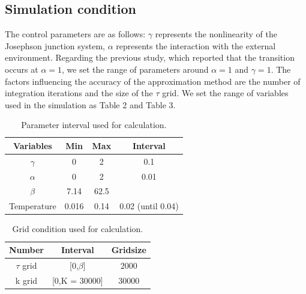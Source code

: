 \documentclass{article}[12pt]
\begin{document}
\begin{spacing}{1.5}
\subsection{Simulation condition}
The control parameters are as follows: $\gamma$ represents the nonlinearity of the Josephson junction system, 
$\alpha$ represents the interaction with the external environment. Regarding the previous study, which reported 
that the transition occurs at $\alpha = 1$, we set the range of parameters around $\alpha = 1$ and $\gamma = 1$. 
The factors influencing the accuracy of the approximation method are the number of integration iterations and the size of the $\tau$ grid. 
We set the range of variables used in the simulation as Table 2 and Table 3.
\begin{table}[htbp]
  \centering
  \renewcommand{\arraystretch}{1.2}  %
  \begin{tabular}{@{}cccc@{}}
  \toprule
  \textbf{Variables} & \textbf{Min} & \textbf{Max}  & \textbf{Interval}\\ 
  \midrule
  $\gamma$ & 0 & 2 & 0.1 \\
  $\alpha$ & 0 & 2 & 0.01 \\
  $\beta$ & 7.14 & 62.5 &  \\
  Temperature & 0.016 & 0.14 & 0.02 (until 0.04) \\
  \bottomrule
  \end{tabular}
  \caption{Parameter interval used for calculation.}
  \end{table}
\begin{table}[htbp]
  \centering
  \renewcommand{\arraystretch}{1.2}  %
  \begin{tabular}{@{}ccc@{}}
  \toprule
  \textbf{Number} & \textbf{Interval} & \textbf{Gridsize}\\ 
  \midrule
  $\tau$ grid & [0,$\beta$] & 2000 \\
  k grid & [0,K = 30000] & 30000 \\
  \bottomrule
  \end{tabular}
  \caption{Grid condition used for calculation.}
  \end{table}

\end{spacing}
\end{document}
